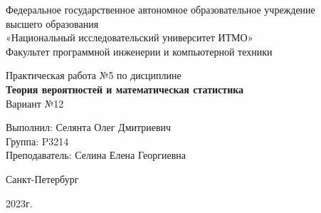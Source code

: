 \begin{center}
	{\large
	Федеральное государственное автономное образовательное учреждение\\
	высшего образования\\
	«Национальный исследовательский университет ИТМО»\\

	\vspace{5pt}
	Факультет программной инженерии и компьютерной техники\\
	}
	\vspace{17em}

	{\Large Практическая работа №5} \Large по дисциплине\\
	\smallskip
	{\LARGE \textbf{Теория вероятностей и
			математическая статистика}}\\[1em]
	{\large Вариант №12}


\end{center}

\vspace{20em}
{\large
\begin{flushright}
	Выполнил: Селянта Олег Дмитриевич\\
	Группа: P3214\\
	Преподаватель: Селина Елена Георгиевна\\
\end{flushright}

\vspace{\fill}

\begin{center}
	Санкт-Петербург

	2023г.
\end{center}
}